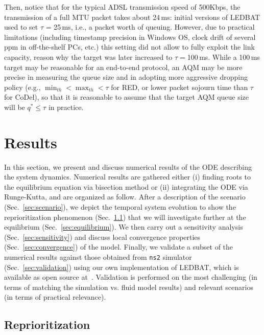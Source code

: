 \documentclass[conference]{IEEEtran}
\newcommand{\secR}[1]{Sec.~\ref{sec:#1}}
\newcommand{\secL}[1]{\label{sec:#1}}
\begin{document}
Then, notice that for the typical ADSL transmission speed of 500Kbps, the transmission  of a full MTU packet takes about 24\,ms: initial versions of LEDBAT used to set $\tau$ = 25\,ms, i.e., a packet worth of queuing. However, due to practical limitations (including timestamp precision in Windows OS, clock drift of several ppm in off-the-shelf PCs, etc.) this  setting did not allow to fully exploit the link capacity, reason why the target was later increased to $\tau=$100\,ms. While a 100\,ms target may be reasonable for an end-to-end protocol, an AQM may be more precise in measuring the queue size and in adopting more aggressive dropping policy (e.g., $\min_{th} < \max_{th} < \tau$ for RED, or lower packet sojourn time than $\tau$  for CoDel), so that it is reasonable to assume that the target AQM queue size will be $q^* \le  \tau$ in practice.
 
 







\section{Results}\secL{results}
In this section, we present and discuss numerical results of the ODE describing the system dynamics. Numerical results are gathered either (i) finding roots to the equilibrium equation via bisection method or (ii) integrating the ODE via Runge-Kutta, and are organized as follow. After a description of the scenario (\secR{scenario}), we depict the temporal system evolution to show the reprioritization phenomenon (\secR{reprioritization}) that we will investigate further at the equilibrium (\secR{equilibrium}). We then carry out a sensitivity analysis (\secR{sensitivity}) and discuss local convergence properties (\secR{convergence}) of the model. Finally, we validate a subset of the numerical results against those obtained from \verb!ns2! simulator (\secR{validation}) using our own implementation of LEDBAT, which is available as open source at~\cite{ledbat_code}. Validation is performed on the most challenging (in terms of matching the simulation vs. fluid model results) and relevant  scenarios (in terms of practical relevance).



\subsection{Reprioritization}\secL{reprioritization}
\end{document}
